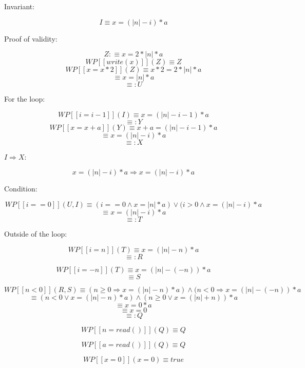 \documentclass{article}
\begin{document}
Invariant:

$$ I \equiv x=(|n|-i)*a $$

Proof of validity:

$$ Z:\equiv x=2*|n|*a $$
$$ WP[\![write(x)]\!](Z) \equiv Z $$
$$ WP[\![x=x*2]\!](Z) \equiv x*2=2*|n|*a $$
$$ \equiv x=|n|*a $$
$$ \equiv: U $$

For the loop:

$$ WP[\![i=i-1]\!](I) \equiv x=(|n|-i-1)*a $$
$$ \equiv: Y $$
$$ WP[\![x=x+a]\!](Y) \equiv x+a=(|n|-i-1)*a $$
$$ \equiv x=(|n|-i)*a $$
$$ \equiv: X $$

$ I \Rightarrow X $:

$$ x=(|n|-i)*a \Rightarrow x=(|n|-i)*a $$

Condition:

$$ WP[\![i==0]\!](U, I) \equiv (i==0 \land x=|n|*a) \lor (i>0 \land x=(|n|-i)*a $$
$$ \equiv x=(|n|-i)*a $$
$$ \equiv: T $$

Outside of the loop:

$$ WP[\![i=n]\!](T) \equiv x=(|n|-n)*a $$
$$ \equiv: R $$

$$ WP[\![i=-n]\!](T) \equiv x=(|n|-(-n))*a $$
$$ \equiv S $$

$$ WP [\![n<0]\!](R, S) \equiv (n \ge 0 \Rightarrow x=(|n|-n)*a) \land (n < 0 \Rightarrow x=(|n|-(-n))*a $$
$$ \equiv (n<0 \lor x=(|n|-n)*a) \land (n \ge 0 \lor x=(|n|+n))*a $$
$$ \equiv x=0*a $$
$$ \equiv x=0 $$
$$ \equiv: Q $$

$$ WP[\![n=read()]\!](Q) \equiv Q $$

$$ WP[\![a=read()]\!](Q) \equiv Q $$

$$ WP[\![x=0]\!](x=0) \equiv true $$
\end{document}
